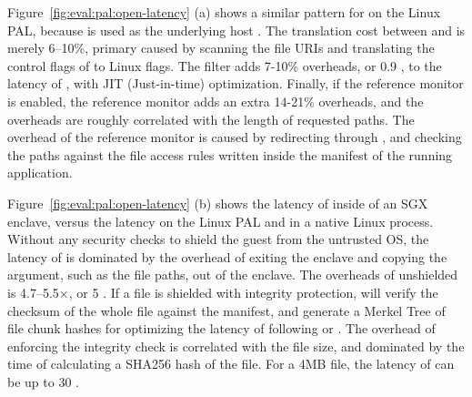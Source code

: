 Figure~\ref{fig:eval:pal:open-latency} (a)
shows a similar pattern for 
on the Linux PAL,
because  is used as the underlying host \linuxapi{}. %
The translation cost between  and  is merely 6--10\%,
primary caused by scanning the file URIs and translating
the control flags of 
to Linux \linuxapi{} flags.
The \seccomp{} filter adds 7-10\% overheads, or \roughly{}0.9 \usec{}, to the latency of , with JIT (Just-in-time) optimization. Finally, if the reference monitor is enabled, the reference monitor adds an extra 14-21\% overheads, and the overheads are roughly correlated with the length of requested paths.
The overhead of the reference monitor
is caused by redirecting  \linuxapis{} through , and checking the paths against the file access rules written inside the manifest of the running application.  












Figure~\ref{fig:eval:pal:open-latency} (b) shows the latency of  inside of an SGX enclave, versus the latency on the Linux PAL
and in a native Linux process.
Without any security checks to shield the guest from the untrusted OS,
the latency of  is dominated by the overhead of exiting the enclave and copying the argument, such as the file paths, out of the enclave.
The overheads of unshielded  is 4.7--5.5$\times$, or \roughly{}5 \usec{}.
If a file is shielded with integrity protection,
 will verify the checksum of the whole file against the manifest, and generate a Merkel Tree of file chunk hashes
for optimizing the latency of following  or .
The overhead of enforcing the integrity check is correlated with the file size, and dominated by the time of
calculating a SHA256 hash of the file.
For a 4MB file, the latency of  can be up to \roughly{}30 \msec{}.









